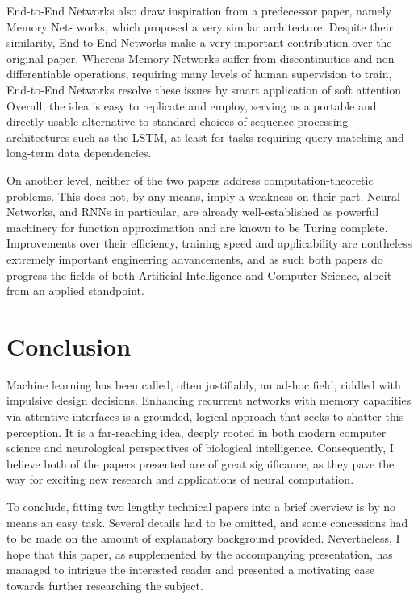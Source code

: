 \documentclass[]{article}
\begin{document}
End-to-End Networks also draw inspiration from a predecessor paper, namely Memory Net-
works\cite{DBLP:journals/corr/WestonCB14}, which proposed a very similar architecture. Despite their similarity, End-to-End Networks make a very important contribution over the original paper. Whereas Memory Networks suffer from discontinuities and non-differentiable operations, requiring many levels of human supervision to train, End-to-End Networks resolve these issues by smart application of soft attention. Overall, the idea is easy to replicate and employ, serving as a portable and directly usable alternative to standard choices of sequence processing architectures such as the LSTM, at least for tasks requiring query matching and long-term data dependencies.

On another level, neither of the two papers address computation-theoretic problems. This does not, by any means, imply a weakness on their part. Neural Networks, and RNNs in particular, are already well-established as powerful machinery for function approximation\cite{Cybenko1989} and are known to be Turing complete\cite{SIEGELMANN1995132}. Improvements over their efficiency, training speed and applicability are nontheless extremely important engineering advancements, and as such both papers do progress the fields of both Artificial Intelligence and Computer Science, albeit from an applied standpoint.

\section{Conclusion}
\label{Conc}
Machine learning has been called, often justifiably, an ad-hoc field, riddled with impulsive design decisions. Enhancing recurrent networks with memory capacities via attentive interfaces is a grounded, logical approach that seeks to shatter this perception. It is a far-reaching idea, deeply rooted in both modern computer science and neurological perspectives of biological intelligence. Consequently, I believe both of the papers presented are of great significance, as they pave the way for exciting new research and applications of neural computation.

To conclude, fitting two lengthy technical papers into a brief overview is by no means an easy task. Several details had to be omitted, and some concessions had to be made on the amount of explanatory background provided. Nevertheless, I hope that this paper, as supplemented by the accompanying presentation, has managed to intrigue the interested reader and presented a motivating case towards further researching the subject. 



\end{document}
